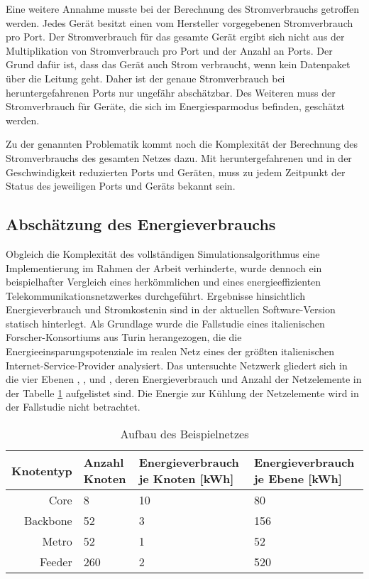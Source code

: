 Eine weitere Annahme musste bei der Berechnung des Stromverbrauchs getroffen werden. Jedes Gerät besitzt einen vom Hersteller vorgegebenen Stromverbrauch pro Port. Der Stromverbrauch für das gesamte Gerät ergibt sich nicht aus der Multiplikation von Stromverbrauch pro Port und der Anzahl an Ports. Der Grund dafür ist, dass das Gerät auch Strom verbraucht, wenn kein Datenpaket über die Leitung geht. Daher ist der genaue Stromverbrauch bei heruntergefahrenen Ports nur ungefähr abschätzbar. Des Weiteren  muss der Stromverbrauch für Geräte, die sich im Energiesparmodus befinden, geschätzt werden. 

Zu der genannten Problematik kommt noch die Komplexität der Berechnung des Stromverbrauchs des gesamten Netzes dazu. Mit heruntergefahrenen und in der Geschwindigkeit reduzierten Ports und Geräten, muss zu jedem Zeitpunkt der Status des jeweiligen Ports und Geräts bekannt sein.  


\subsection{Abschätzung des Energieverbrauchs} \label{subsec:VorgSch}

Obgleich die Komplexität des vollständigen Simulationsalgorithmus eine Implementierung im Rahmen der Arbeit verhinderte, wurde dennoch ein beispielhafter Vergleich eines herkömmlichen und eines energieeffizienten Telekommunikationsnetzwerkes durchgeführt. Ergebnisse hinsichtlich Energieverbrauch und Stromkostenin sind in der aktuellen Software-Version statisch hinterlegt. Als Grundlage wurde die Fallstudie eines italienischen Forscher-Konsortiums aus Turin herangezogen, die die Energieeinsparungspotenziale im realen Netz eines der größten italienischen Internet-Service-Provider analysiert\cite{Chiaraviglio2009}. Das untersuchte Netzwerk gliedert sich in die vier Ebenen , ,  und , deren Energieverbrauch und Anzahl der Netzelemente in der Tabelle \ref{tab:beispielnetz} aufgelistet sind\cite[2]{Chiaraviglio2009}. Die Energie zur Kühlung der Netzelemente wird in der Fallstudie nicht betrachtet.




\begin{table}[ht]
\centering
\caption{Aufbau des Beispielnetzes}
\label{tab:beispielnetz}
\begin{tabularx}{\textwidth}{ | r | l | X | X | }
	\hline
	\textbf{Knotentyp} & \textbf{Anzahl Knoten} & \textbf{Energieverbrauch \newline je Knoten [kWh]} & \textbf{Energieverbrauch \newline je Ebene [kWh]}\\ \hline\hline
Core & 8 & 10 & 80\\ \hline
Backbone & 52 & 3 & 156\\ \hline
Metro & 52 & 1 & 52\\ \hline
Feeder & 260 & 2 & 520\\ \hline
\end{tabularx}
\end{table}

